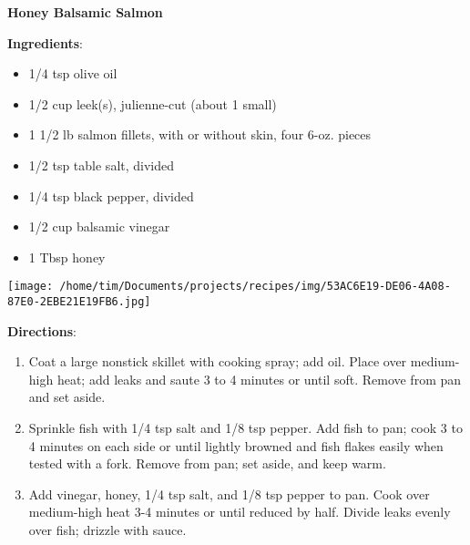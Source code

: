 \documentclass[11pt, twoside, openany]{book}
\begin{document}
\noindent\begin{minipage}[t]{\linewidth}%
{\Large\textbf{Honey Balsamic Salmon}} \label{honey-balsamic-salmon}\hfill\textit{}\\
\noindent\begin{minipage}[t]{0.78\linewidth}%
\textbf{Ingredients}:\vspace{-3mm}
\begin{multicols}{2}
\begin{itemize}\setlength\itemsep{-1mm}
\item 1/4 tsp olive oil
\item 1/2 cup leek(s), julienne-cut (about 1 small)
\item 1 1/2 lb salmon fillets, with or without skin, four 6-oz. pieces
\item 1/2 tsp table salt, divided
\item 1/4 tsp black pepper, divided
\item 1/2 cup balsamic vinegar
\item 1 Tbsp honey
\end{itemize}
\end{multicols}
\end{minipage}
\noindent\begin{minipage}[t]{0.18\linewidth}
\centering \strut\vspace*{-\baselineskip}\newline
\texttt{[image: /home/tim/Documents/projects/recipes/img/53AC6E19-DE06-4A08-87E0-2EBE21E19FB6.jpg]}\\
\end{minipage}\vspace{3mm}
\textbf{Directions}:
\vspace{-3mm}\begin{enumerate}\setlength\itemsep{-1mm}
\item Coat a large nonstick skillet with cooking spray; add oil. Place over medium-high heat; add leaks and saute 3 to 4 minutes or until soft. Remove from pan and set aside.
\item Sprinkle fish with 1/4 tsp salt and 1/8 tsp pepper. Add fish to pan; cook 3 to 4 minutes on each side or until lightly browned and fish flakes easily when tested with a fork. Remove from pan; set aside, and keep warm.
\item Add vinegar, honey, 1/4 tsp salt, and 1/8 tsp pepper to pan. Cook over medium-high heat 3-4 minutes or until reduced by half. Divide leaks evenly over fish; drizzle with sauce. 
\end{enumerate}
\end{minipage}\vspace{8mm}
\end{document}
